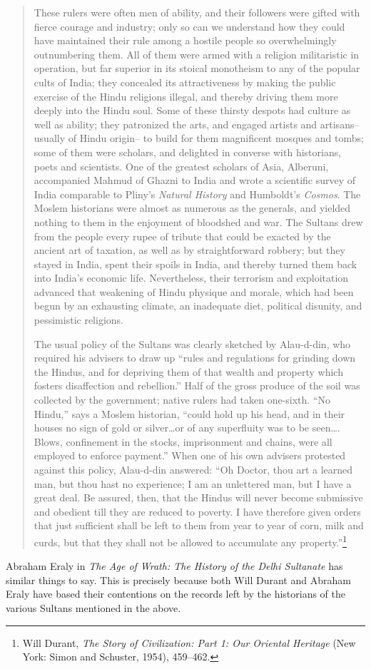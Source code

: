 \begin{quotation}
\indent
These rulers were often men of ability, and their followers were gifted with fierce courage and industry; only so can we understand how they could have maintained their rule among a hostile people so overwhelmingly outnumbering them. All of them were armed with a religion militaristic in operation, but far superior in its stoical monotheism to any of the popular cults of India; they concealed its attractiveness by making the public exercise of the Hindu religions illegal, and thereby driving them more deeply into the Hindu soul. Some of these thirsty despots had culture as well as ability; they patronized the arts, and engaged artists and artisans–usually of Hindu origin– to build for them magnificent mosques and tombs; some of them were scholars, and delighted in converse with historians, poets and scientists. One of the greatest scholars of Asia, Alberuni, accompanied Mahmud of Ghazni to India and wrote a scientific survey of India comparable to Pliny’s \textit{Natural History} and Humboldt’s \textit{Cosmos}. The Moslem historians were almost as numerous as the generals, and yielded nothing to them in the enjoyment of bloodshed and war. The Sultans drew from the people every rupee of tribute that could be exacted by the ancient art of taxation, as well as by straightforward robbery; but they stayed in India, spent their spoils in India, and thereby turned them back into India’s economic life. Nevertheless, their terrorism and exploitation advanced that weakening of Hindu physique and morale, which had been begun by an exhausting climate, an inadequate diet, political disunity, and pessimistic religions. 
\medskip

\indent
The usual policy of the Sultans was clearly sketched by Alau-d-din, who required his advisers to draw up “rules and regulations for grinding down the Hindus, and for depriving them of that wealth and property which fosters disaffection and rebellion.” Half of the gross produce of the soil was collected by the government; native rulers had taken one-sixth. “No Hindu,” says a Moslem historian, “could hold up his head, and in their houses no sign of gold or silver…or of any superfluity was to be seen…. Blows, confinement in the stocks, imprisonment and chains, were all employed to enforce payment.” When one of his own advisers protested against this policy, Alau-d-din answered: “Oh Doctor, thou art a learned man, but thou hast no experience; I am an unlettered man, but I have a great deal. Be assured, then, that the Hindus will never become submissive and obedient till they are reduced to poverty. I have therefore given orders that just sufficient shall be left to them from year to year of corn, milk and curds, but that they shall not be allowed to accumulate any property.”\footnote{Will Durant, \textit{The Story of Civilization: Part 1: Our Oriental Heritage} (New York: Simon and Schuster, 1954), 459--462.} 
\end{quotation}
Abraham Eraly in \textit{The Age of Wrath: The History of the Delhi Sultanate} has similar things to say. This is precisely because both Will Durant and Abraham Eraly have based their contentions on the records left by the historians of the various Sultans mentioned in the above.
\bigskip

